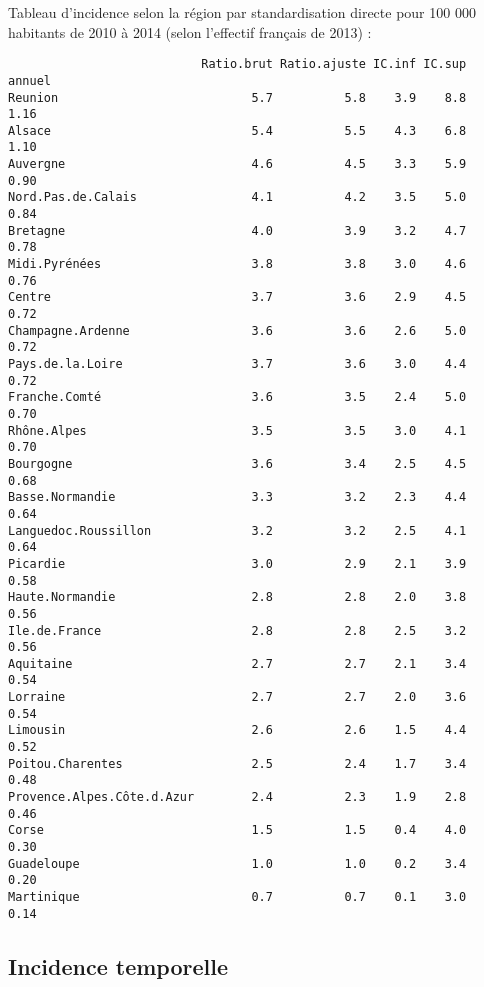 \documentclass[11pt,a4paper]{article}\usepackage[]{graphicx}\usepackage[]{color}
\makeatletter
\newenvironment{kframe}{%
 \def\at@end@of@kframe{}%
 \ifinner\ifhmode%
  \def\at@end@of@kframe{\end{minipage}}%
  \begin{minipage}{\columnwidth}%
 \fi\fi%
 \def\FrameCommand##1{\hskip\@totalleftmargin \hskip-\fboxsep
 \colorbox{shadecolor}{##1}\hskip-\fboxsep
     \hskip-\linewidth \hskip-\@totalleftmargin \hskip\columnwidth}%
 \MakeFramed {\advance\hsize-\width
   \@totalleftmargin\z@ \linewidth\hsize
   \@setminipage}}%
 {\par\unskip\endMakeFramed%
 \at@end@of@kframe}
\newenvironment{knitrout}{}{} %
\makeatother
\begin{document}
Tableau d'incidence selon la région par standardisation directe pour 100 000 habitants de 2010 à 2014 (selon l'effectif français de 2013) :
\begin{knitrout}
\color{fgcolor}\begin{kframe}
\begin{verbatim}
                           Ratio.brut Ratio.ajuste IC.inf IC.sup annuel
Reunion                           5.7          5.8    3.9    8.8   1.16
Alsace                            5.4          5.5    4.3    6.8   1.10
Auvergne                          4.6          4.5    3.3    5.9   0.90
Nord.Pas.de.Calais                4.1          4.2    3.5    5.0   0.84
Bretagne                          4.0          3.9    3.2    4.7   0.78
Midi.Pyrénées                     3.8          3.8    3.0    4.6   0.76
Centre                            3.7          3.6    2.9    4.5   0.72
Champagne.Ardenne                 3.6          3.6    2.6    5.0   0.72
Pays.de.la.Loire                  3.7          3.6    3.0    4.4   0.72
Franche.Comté                     3.6          3.5    2.4    5.0   0.70
Rhône.Alpes                       3.5          3.5    3.0    4.1   0.70
Bourgogne                         3.6          3.4    2.5    4.5   0.68
Basse.Normandie                   3.3          3.2    2.3    4.4   0.64
Languedoc.Roussillon              3.2          3.2    2.5    4.1   0.64
Picardie                          3.0          2.9    2.1    3.9   0.58
Haute.Normandie                   2.8          2.8    2.0    3.8   0.56
Ile.de.France                     2.8          2.8    2.5    3.2   0.56
Aquitaine                         2.7          2.7    2.1    3.4   0.54
Lorraine                          2.7          2.7    2.0    3.6   0.54
Limousin                          2.6          2.6    1.5    4.4   0.52
Poitou.Charentes                  2.5          2.4    1.7    3.4   0.48
Provence.Alpes.Côte.d.Azur        2.4          2.3    1.9    2.8   0.46
Corse                             1.5          1.5    0.4    4.0   0.30
Guadeloupe                        1.0          1.0    0.2    3.4   0.20
Martinique                        0.7          0.7    0.1    3.0   0.14
\end{verbatim}
\end{kframe}
\end{knitrout}

  \subsection{Incidence temporelle}
\end{document}
